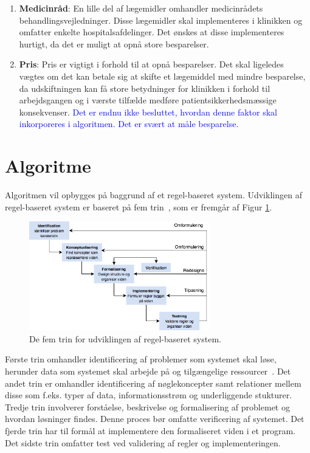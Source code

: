 \begin{enumerate}
 \vspace{2mm}
\item \textbf{Medicinråd}: En lille del af lægemidler omhandler medicinrådets behandlingsvejledninger. Disse lægemidler skal implementeres i klinikken og omfatter enkelte hospitalsafdelinger. Det ønskes at disse implementeres hurtigt, da det er muligt at opnå store besparelser. \vspace{2mm}
\item \textbf{Pris}: Pris er vigtigt i forhold til at opnå besparelser. Det skal ligeledes vægtes om det kan betale sig at skifte et lægemiddel med mindre besparelse, da udskiftningen kan få store betydninger for klinikken i forhold til arbejdsgangen og i værste tilfælde medføre patientsikkerhedsmæssige konsekvenser. \textcolor{blue}{Det er endnu ikke besluttet, hvordan denne faktor skal inkorporeres i algoritmen. Det er svært at måle besparelse.}\vspace{2mm}
\end{enumerate}

\section{Algoritme}
Algoritmen vil opbygges på baggrund af et regel-baseret system. %
Udviklingen af regel-baseret system er baseret på fem trin~\citep{Ligeza2006}, som er fremgår af Figur \ref{fig:metode}.  

\begin{figure}[H]\centering	\includegraphics[width=0.7\textwidth]{Statusseminar/metode.png} 
	\caption{De fem trin for udviklingen af regel-baseret system.~\citep{Ligeza2006}}
	\label{fig:metode}  
\end{figure}
\vspace{-0.5cm}
Første trin omhandler identificering af problemer som systemet skal løse, herunder data som systemet skal arbejde på og tilgængelige ressourcer~\citep{Ligeza2006}. Det andet trin er omhandler identificering af nøglekoncepter samt relationer mellem disse som f.eks. typer af data, informationsstrøm og underliggende stukturer. Tredje trin involverer forståelse, beskrivelse og formalisering af problemet og hvordan løsninger findes. Denne proces bør omfatte verificering af systemet. Det fjerde trin har til formål at implementere den formaliseret viden i et program. Det sidste trin omfatter test ved validering af regler og implementeringen.~\citep{Ligeza2006}
 
